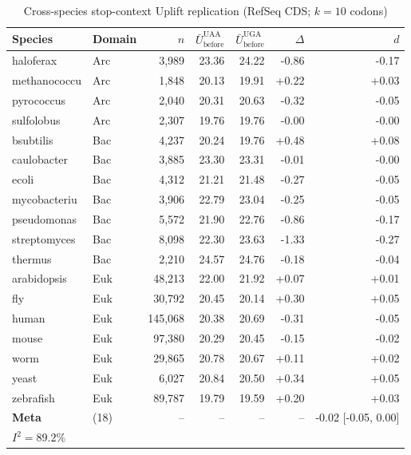 
\begin{table}[htbp]
\centering
\caption{Cross-species stop-context Uplift replication (RefSeq CDS; $k=10$ codons)}
\label{tab:cross_species_stop_context}
\begin{tabular}{llrrrrr}
\toprule
Species & Domain & $n$ & $\bar{U}_{\mathrm{before}}^{\mathrm{UAA}}$ & $\bar{U}_{\mathrm{before}}^{\mathrm{UGA}}$ & $\Delta$ & $d$ \\
\midrule
haloferax & Arc & 3,989 & 23.36 & 24.22 & -0.86 & -0.17 \\
methanococcu & Arc & 1,848 & 20.13 & 19.91 & +0.22 & +0.03 \\
pyrococcus & Arc & 2,040 & 20.31 & 20.63 & -0.32 & -0.05 \\
sulfolobus & Arc & 2,307 & 19.76 & 19.76 & -0.00 & -0.00 \\
bsubtilis & Bac & 4,237 & 20.24 & 19.76 & +0.48 & +0.08 \\
caulobacter & Bac & 3,885 & 23.30 & 23.31 & -0.01 & -0.00 \\
ecoli & Bac & 4,312 & 21.21 & 21.48 & -0.27 & -0.05 \\
mycobacteriu & Bac & 3,906 & 22.79 & 23.04 & -0.25 & -0.05 \\
pseudomonas & Bac & 5,572 & 21.90 & 22.76 & -0.86 & -0.17 \\
streptomyces & Bac & 8,098 & 22.30 & 23.63 & -1.33 & -0.27 \\
thermus & Bac & 2,210 & 24.57 & 24.76 & -0.18 & -0.04 \\
arabidopsis & Euk & 48,213 & 22.00 & 21.92 & +0.07 & +0.01 \\
fly & Euk & 30,792 & 20.45 & 20.14 & +0.30 & +0.05 \\
human & Euk & 145,068 & 20.38 & 20.69 & -0.31 & -0.05 \\
mouse & Euk & 97,380 & 20.29 & 20.45 & -0.15 & -0.02 \\
worm & Euk & 29,865 & 20.78 & 20.67 & +0.11 & +0.02 \\
yeast & Euk & 6,027 & 20.84 & 20.50 & +0.34 & +0.05 \\
zebrafish & Euk & 89,787 & 19.79 & 19.59 & +0.20 & +0.03 \\
\midrule
\textbf{Meta} & (18) & -- & -- & -- & -- & -0.02 [-0.05, 0.00] \\
\multicolumn{7}{l}{$I^2 = 89.2\%$} \\
\bottomrule
\end{tabular}
\end{table}